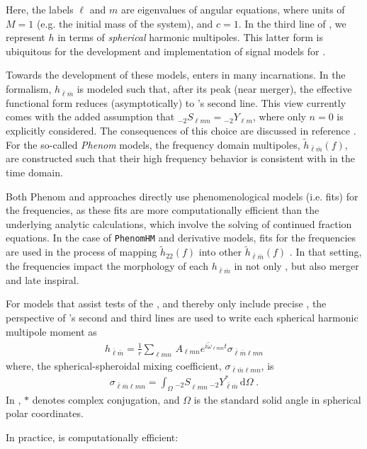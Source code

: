 \documentclass[twocolumn,aps,prd,floatfix,preprintnumbers,a4paper,nofootinbib,
superscriptaddress,10pt]{revtex4-1}
\def\check#1{\red{#1}}
\newcommand{\cw}{\tilde{\omega}}
\def\lmn{_{\ell m n}}
\def\LM{_{\bar{\ell} \bar{m}}}
\def\LMlmn{_{\bar{\ell} \bar{m} \ell m n}}
\begin{document}
%
Here, the labels $\ell$ and $m$ are eigenvalues of  angular equations, where units of $M=1$ (e.g. the initial mass of the \bbh{} system), and $c=1$.
%
In the third line of , we represent $h$ in terms of \textit{spherical} harmonic multipoles.
%
This latter form is ubiquitous for the development and implementation of \imr{} signal models for .
%
%
\par Towards the development of these models,  enters in many incarnations.
%
In the \eob{} formalism, $h\LM$ is modeled such that, after its peak (near merger), the effective functional form reduces (asymptotically) to 's second line.
%
This view currently comes with the added assumption that ${_{-2}}S_{\ell m n} = {_{-2}}Y_{\ell m}$, where only $n=0$ is explicitly considered.
%
The consequences of this choice are discussed in reference \check{[X]}.
%
For the so-called \textit{Phenom} models, the frequency domain multipoles, $\tilde{h}\LM(f)$, are constructed such that their high frequency behavior is consistent with  in the time domain.
%
\par Both Phenom and \eob{} approaches directly use phenomenological models (i.e. fits) for the \qnm{} frequencies, as these fits are more computationally efficient than the underlying analytic calculations, which involve the solving of continued fraction equations.
%
In the case of \texttt{PhenomHM} and derivative models, fits for the \qnm{} frequencies are used in the process of mapping $\tilde{h}_{22}(f)$ into other $\tilde{h}\LM(f)$ \check{[X]}.
%
In that setting, the \qnm{} frequencies impact the morphology of each $h\LM$ in not only \rd{}, but also merger and late inspiral.
%
%
\par For models that assist tests of the \nht{}, and thereby only include precise , the perspective of 's second and third lines are used to write each spherical harmonic multipole moment as
%
\begin{align}
	\label{hlm}
	h\LM = \frac{1}{r} \sum\lmn \, A\lmn e^{i \cw\lmn t} \sigma\LMlmn
\end{align}
%
where, the spherical-spheroidal mixing coefficient, $\sigma\LMlmn$, is
%
\begin{align}
		\label{sigma}
		\sigma\LMlmn = \int_{\Omega} {_{-2}S}\lmn \,  {_{-2}}Y^*\LM \, \mathrm{d} \Omega \; .
\end{align}
%
In , $*$ denotes complex conjugation, and $\Omega$ is the standard solid angle in spherical polar coordinates.
%
\par In practice,  is computationally efficient:
\end{document}
